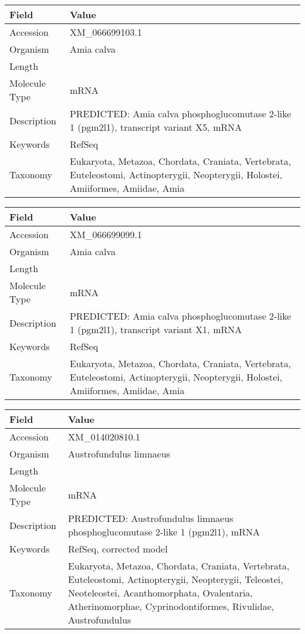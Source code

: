 \documentclass[10pt]{article}
\begin{document}
{\footnotesize
\begin{longtable}{>{\raggedright\arraybackslash}p{4.5cm} >{\raggedright\arraybackslash}p{11.5cm}}
\textbf{Field} & \textbf{Value} \\
\hline
Accession & XM\_066699103.1 \\
Organism & Amia calva \\
Length & 7138 \\
Molecule Type & mRNA \\
Description & PREDICTED: Amia calva phosphoglucomutase 2-like 1 (pgm2l1), transcript variant X5, mRNA \\
Keywords & RefSeq \\
Taxonomy & Eukaryota, Metazoa, Chordata, Craniata, Vertebrata, Euteleostomi, Actinopterygii, Neopterygii, Holostei, Amiiformes, Amiidae, Amia \\
\end{longtable}
}

{\footnotesize
\begin{longtable}{>{\raggedright\arraybackslash}p{4.5cm} >{\raggedright\arraybackslash}p{11.5cm}}
\textbf{Field} & \textbf{Value} \\
\hline
Accession & XM\_066699099.1 \\
Organism & Amia calva \\
Length & 6823 \\
Molecule Type & mRNA \\
Description & PREDICTED: Amia calva phosphoglucomutase 2-like 1 (pgm2l1), transcript variant X1, mRNA \\
Keywords & RefSeq \\
Taxonomy & Eukaryota, Metazoa, Chordata, Craniata, Vertebrata, Euteleostomi, Actinopterygii, Neopterygii, Holostei, Amiiformes, Amiidae, Amia \\
\end{longtable}
}

{\footnotesize
\begin{longtable}{>{\raggedright\arraybackslash}p{4.5cm} >{\raggedright\arraybackslash}p{11.5cm}}
\textbf{Field} & \textbf{Value} \\
\hline
Accession & XM\_014020810.1 \\
Organism & Austrofundulus limnaeus \\
Length & 2242 \\
Molecule Type & mRNA \\
Description & PREDICTED: Austrofundulus limnaeus phosphoglucomutase 2-like 1 (pgm2l1), mRNA \\
Keywords & RefSeq, corrected model \\
Taxonomy & Eukaryota, Metazoa, Chordata, Craniata, Vertebrata, Euteleostomi, Actinopterygii, Neopterygii, Teleostei, Neoteleostei, Acanthomorphata, Ovalentaria, Atherinomorphae, Cyprinodontiformes, Rivulidae, Austrofundulus \\
\end{longtable}
}
\end{document}

